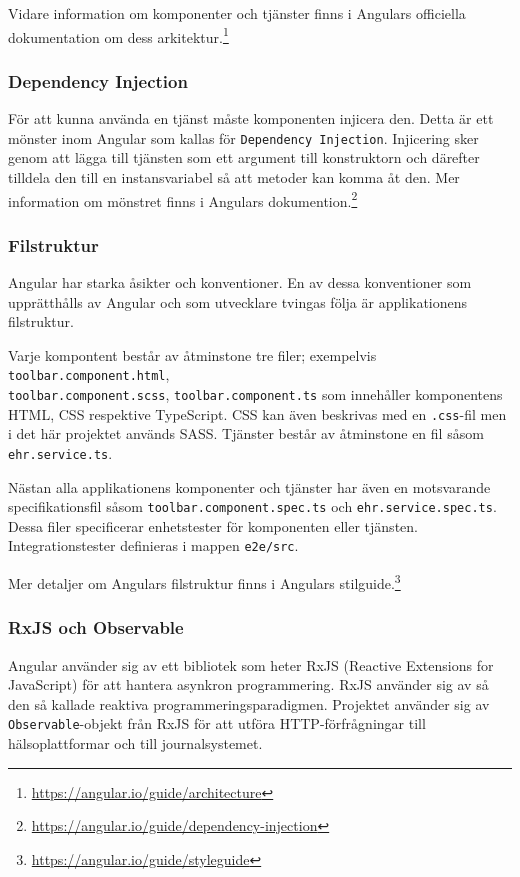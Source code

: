 \documentclass[techdoc/techdoc.tex]{subfiles}
\begin{document}
Vidare information om komponenter och tjänster finns i Angulars officiella
dokumentation om dess arkitektur.\footnote{
    \url{https://angular.io/guide/architecture}
}

\subsubsection{Dependency Injection}
För att kunna använda en tjänst måste komponenten injicera den. Detta är ett
mönster inom Angular som kallas för \texttt{Dependency Injection}. Injicering
sker genom att lägga till tjänsten som ett argument till konstruktorn och
därefter tilldela den till en instansvariabel så att metoder kan komma åt den.
Mer information om mönstret finns i Angulars dokumention.\footnote{
    \url{https://angular.io/guide/dependency-injection}
}

\subsubsection{Filstruktur}
Angular har starka åsikter och konventioner. En av dessa konventioner som
upprätthålls av Angular och som utvecklare tvingas följa är applikationens
filstruktur.

Varje kompontent består av åtminstone tre filer; exempelvis
\texttt{toolbar.component.html},\\ %
\texttt{toolbar.component.scss},
\texttt{toolbar.component.ts}
som innehåller komponentens HTML, CSS respektive TypeScript. CSS kan även
beskrivas med en \texttt{.css}-fil men i det här projektet används SASS.
Tjänster består av åtminstone en fil såsom
\texttt{ehr.service.ts}.

Nästan alla applikationens komponenter och tjänster har även en motsvarande
specifikationsfil såsom
\texttt{toolbar.component.spec.ts} och
\texttt{ehr.service.spec.ts}.
Dessa filer specificerar enhetstester för komponenten eller tjänsten.
Integrationstester definieras i mappen
\texttt{e2e/src}.

Mer detaljer om Angulars filstruktur finns i Angulars stilguide.\footnote{
    \url{https://angular.io/guide/styleguide}
}

\subsubsection{RxJS och Observable}
Angular använder sig av ett bibliotek som heter RxJS (Reactive Extensions for
JavaScript) för att hantera asynkron programmering. RxJS använder sig av så den
så kallade reaktiva programmeringsparadigmen. Projektet använder sig av
\texttt{Observable}-objekt från RxJS för att utföra HTTP-förfrågningar till
hälsoplattformar och till journalsystemet.
\end{document}
